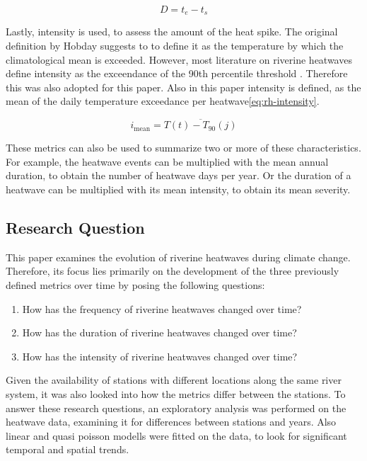 \documentclass[
]{krantz}
\begin{document}
\begin{equation}
D = t_e - t_s
\label{eq:rh-duration}
\end{equation}

Lastly, intensity is used, to assess the amount of the heat spike. The original definition by Hobday suggests to to define it as the temperature by which the climatological mean is exceeded. However, most literature on riverine heatwaves define intensity as the exceendance of the 90th percentile threshold \citep{sadayappan2025} \citep{chen2026}. Therefore this was also adopted for this paper. Also in this paper intensity is defined, as the mean of the daily temperature exceedance per heatwave\eqref{eq:rh-intensity}.

\begin{equation}
i_{\mathrm{mean}}
=
\overline{T(t)-T_{90}(j)}
\label{eq:rh-intensity}
\end{equation}

These metrics can also be used to summarize two or more of these characteristics. For example, the heatwave events can
be multiplied with the mean annual duration, to obtain the number of heatwave days per year. Or the duration of a
heatwave can be multiplied with its mean intensity, to obtain its mean severity.

\subsection{Research Question}\label{research-question}

This paper examines the evolution of riverine heatwaves during climate change. Therefore, its focus lies primarily on the development of the three previously defined metrics over time by posing the following questions:

\begin{enumerate}
\def\labelenumi{\arabic{enumi}.}
\item
  How has the frequency of riverine heatwaves changed over time?
\item
  How has the duration of riverine heatwaves changed over time?
\item
  How has the intensity of riverine heatwaves changed over time?
\end{enumerate}

Given the availability of stations with different locations along the same river system, it was also looked into how
the metrics differ between the stations. To answer these research questions, an exploratory analysis was performed
on the heatwave data, examining it for differences between stations and years. Also linear and quasi poisson modells
were fitted on the data, to look for significant temporal and spatial trends.
\end{document}
